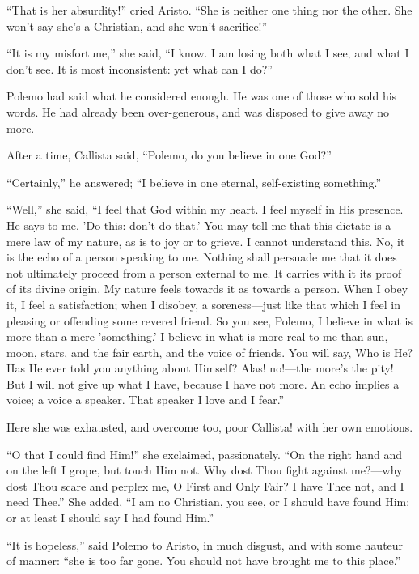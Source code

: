 ``That is her absurdity!'' cried Aristo. ``She is
neither one thing nor the other. She won't say she's a Christian, and
she won't sacrifice!''

``It is my misfortune,'' she said, ``I know. I am
losing both what I see, and what I don't see. It is most inconsistent:
yet what can I do?''

Polemo had said what he considered enough. He was one of those who
sold his words. He had already been over-generous, and was disposed to
give away no more.

After a time, Callista said, ``Polemo, do you believe in one
God?''

``Certainly,'' he answered; ``I believe in one eternal,
self-existing something.''

``Well,'' she said, ``I feel that God within my heart.
I feel myself in His presence. He says to me, 'Do this: don't do
that.' You may tell me that this dictate is a mere law of my nature,
as is to joy or to grieve. I cannot understand this. No, it is the
echo of a person speaking to me. Nothing shall persuade me that it
does not ultimately proceed from a person external to me. It carries
with it its proof of its divine origin. My nature feels towards it as
towards a person. When I obey it, I feel a satisfaction; when I
disobey, a soreness—just like that which I feel in pleasing or
offending some revered friend. So you see, Polemo, I believe in what
is more than a mere 'something.' I believe in what is more real to me
than sun, moon, stars, and the fair earth, and the voice of
friends. You will say, Who is He? Has He ever told you anything about
Himself? Alas! no!—the more's the pity! But I will not give up what
I have, because I have not more. An echo implies a voice; a voice a
speaker. That speaker I love and I fear.''

Here she was exhausted, and overcome too, poor Callista! with her
own emotions.

``O that I could find Him!'' she exclaimed, passionately.
``On the right hand and on the left I grope, but touch Him not.
Why dost Thou fight against me?—why dost Thou scare and perplex me,
O First and Only Fair? I have Thee not, and I need Thee.'' She
added, ``I am no Christian, you see, or I should have found Him;
or at least I should say I had found Him.''

``It is hopeless,'' said Polemo to Aristo, in much disgust,
and with some hauteur of manner: ``she is too far gone. You should
not have brought me to this place.''

